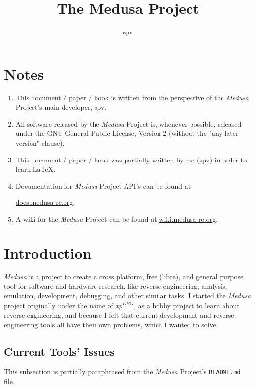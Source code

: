 \documentclass{article}
\title{The Medusa Project}
\author{spv}
\begin{document}
	\maketitle

	\section{Notes}
	\begin{enumerate}
		\item This document / paper / book is written from the perspective of
		the \textit{Medusa} Project's main developer, spv.

		\item All software released by the \textit{Medusa} Project is, whenever
		possible, released under the GNU General Public License, Version 2
		(without the "any later version" clause).

		\item This document / paper / book was partially written by me (spv) in
		order to learn \LaTeX.

		\item Documentation for \textit{Medusa} Project API's can be found at
		
		\href{https://docs.medusa-re.org}{docs.medusa-re.org}.

		\item A wiki for the \textit{Medusa} Project can be found at
		\href{https://wiki.medusa-re.org}{wiki.medusa-re.org}.
	\end{enumerate}

	\section{Introduction}
	\textit{Medusa} is a project to create a cross platform, free (libre), and
	general purpose tool for software and hardware research, like reverse
	engineering, analysis, emulation, development, debugging, and other similar
	tasks. I started the \textit{Medusa} project originally under the name of
	\textit{xp$^{DBG}$}, as a hobby project to learn about reverse engineering,
	and because I felt that current development and reverse engineering tools
	all have their own problems, which I wanted to solve.

	\subsection{Current Tools' Issues}
	This subsection is partially paraphrased from the \textit{Medusa} Project's
	\texttt{README.md} file.
\end{document}
